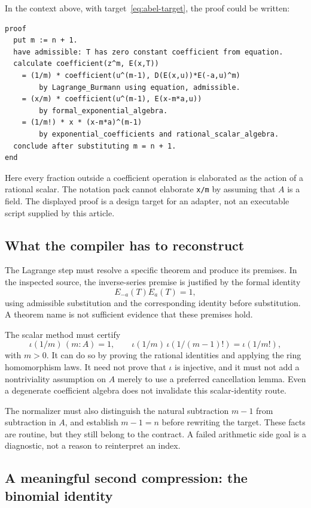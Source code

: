 \documentclass[11pt,a4paper]{article}
\newcommand{\code}[1]{\texttt{#1}}
\theoremstyle{remark}
\begin{document}
In the context above, with target~\eqref{eq:abel-target}, the proof could be written:
\begin{lstlisting}[caption={An MPL reconstruction of the Abel coefficient argument.}]
proof
  put m := n + 1.
  have admissible: T has zero constant coefficient from equation.
  calculate coefficient(z^m, E(x,T))
    = (1/m) * coefficient(u^(m-1), D(E(x,u))*E(-a,u)^m)
        by Lagrange_Burmann using equation, admissible.
    = (x/m) * coefficient(u^(m-1), E(x-m*a,u))
        by formal_exponential_algebra.
    = (1/m!) * x * (x-m*a)^(m-1)
        by exponential_coefficients and rational_scalar_algebra.
  conclude after substituting m = n + 1.
end
\end{lstlisting}
Here every fraction outside a coefficient operation is elaborated as the action of a rational scalar. The notation pack cannot elaborate \code{x/m} by assuming that $A$ is a field. The displayed proof is a design target for an adapter, not an executable script supplied by this article.

\subsection{What the compiler has to reconstruct}

The Lagrange step must resolve a specific theorem and produce its premises. In the inspected source, the inverse-series premise is justified by the formal identity
\[
E_{-a}(T)E_a(T)=1,
\]
using admissible substitution and the corresponding identity before substitution. A theorem name is not sufficient evidence that these premises hold.

The scalar method must certify
\[
\iota(1/m)\,(m\!:\!A)=1,
\qquad
\iota(1/m)\,\iota(1/(m-1)!)=\iota(1/m!),
\]
with $m>0$. It can do so by proving the rational identities and applying the ring homomorphism laws. It need not prove that $\iota$ is injective, and it must not add a nontriviality assumption on $A$ merely to use a preferred cancellation lemma. Even a degenerate coefficient algebra does not invalidate this scalar-identity route.

The normalizer must also distinguish the natural subtraction $m-1$ from subtraction in $A$, and establish $m-1=n$ before rewriting the target. These facts are routine, but they still belong to the contract. A failed arithmetic side goal is a diagnostic, not a reason to reinterpret an index.

\subsection{A meaningful second compression: the binomial identity}
\end{document}
